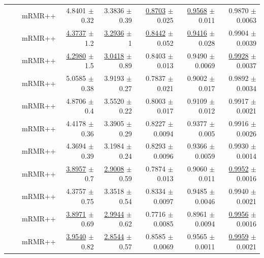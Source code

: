\begin{longtable}{llp{}rrrrr}
 &  & mRMR++ & 4.8401 {\scriptsize $\pm$ 0.32} & 3.3836 {\scriptsize $\pm$ 0.39} & \underline{0.8703} {\scriptsize $\pm$ 0.025} & \underline{0.9568} {\scriptsize $\pm$ 0.011} & 0.9870 {\scriptsize $\pm$ 0.0063} \\
 &  & mRMR++ & \underline{4.3737} {\scriptsize $\pm$ 1.2} & \underline{3.2936} {\scriptsize $\pm$ 1} & \underline{0.8442} {\scriptsize $\pm$ 0.052} & \underline{0.9416} {\scriptsize $\pm$ 0.028} & 0.9904 {\scriptsize $\pm$ 0.0039} \\
 &  & mRMR++ & \underline{4.2980} {\scriptsize $\pm$ 1.5} & \underline{3.0418} {\scriptsize $\pm$ 0.89} & 0.8403 {\scriptsize $\pm$ 0.013} & 0.9490 {\scriptsize $\pm$ 0.0069} & \underline{0.9928} {\scriptsize $\pm$ 0.0037} \\
 &  & mRMR++ & 5.0585 {\scriptsize $\pm$ 0.38} & 3.9193 {\scriptsize $\pm$ 0.27} & 0.7837 {\scriptsize $\pm$ 0.021} & 0.9002 {\scriptsize $\pm$ 0.017} & 0.9892 {\scriptsize $\pm$ 0.0034} \\
 &  & mRMR++ & 4.8706 {\scriptsize $\pm$ 0.4} & 3.5520 {\scriptsize $\pm$ 0.22} & 0.8003 {\scriptsize $\pm$ 0.017} & 0.9109 {\scriptsize $\pm$ 0.012} & 0.9917 {\scriptsize $\pm$ 0.0021} \\
 &  & mRMR++ & 4.4178 {\scriptsize $\pm$ 0.36} & 3.3905 {\scriptsize $\pm$ 0.29} & 0.8227 {\scriptsize $\pm$ 0.0094} & 0.9377 {\scriptsize $\pm$ 0.005} & 0.9916 {\scriptsize $\pm$ 0.0026} \\
 &  & mRMR++ & 4.3694 {\scriptsize $\pm$ 0.39} & 3.1984 {\scriptsize $\pm$ 0.24} & 0.8293 {\scriptsize $\pm$ 0.0096} & 0.9366 {\scriptsize $\pm$ 0.0059} & 0.9930 {\scriptsize $\pm$ 0.0014} \\
 &  & mRMR++ & \underline{3.8957} {\scriptsize $\pm$ 0.7} & \underline{2.9008} {\scriptsize $\pm$ 0.59} & 0.7874 {\scriptsize $\pm$ 0.013} & 0.9060 {\scriptsize $\pm$ 0.011} & \underline{0.9952} {\scriptsize $\pm$ 0.0016} \\
 &  & mRMR++ & 4.3757 {\scriptsize $\pm$ 0.75} & 3.3518 {\scriptsize $\pm$ 0.54} & 0.8334 {\scriptsize $\pm$ 0.0097} & 0.9485 {\scriptsize $\pm$ 0.0046} & 0.9940 {\scriptsize $\pm$ 0.0021} \\
 &  & mRMR++ & \underline{3.8971} {\scriptsize $\pm$ 0.69} & \underline{2.9944} {\scriptsize $\pm$ 0.62} & 0.7716 {\scriptsize $\pm$ 0.0085} & 0.8961 {\scriptsize $\pm$ 0.0094} & \underline{0.9956} {\scriptsize $\pm$ 0.0016} \\
 &  & mRMR++ & \underline{3.9540} {\scriptsize $\pm$ 0.82} & \underline{2.8544} {\scriptsize $\pm$ 0.57} & 0.8585 {\scriptsize $\pm$ 0.0069} & 0.9565 {\scriptsize $\pm$ 0.0011} & \underline{0.9959} {\scriptsize $\pm$ 0.0021} \\

\end{longtable}
